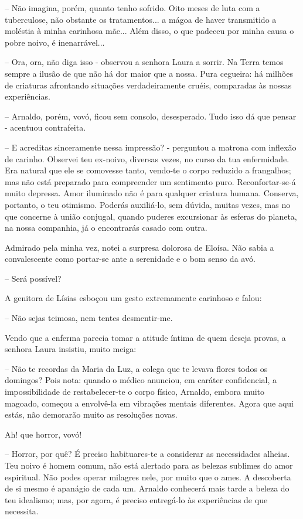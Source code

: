 \documentclass[portuguese,12pt,a4paper]{scrbook}
\begin{document}
	– Não imagina, porém, quanto tenho sofrido. Oito meses de luta com a tuberculose, não obstante os tratamentos... a mágoa de haver transmitido a moléstia à minha carinhosa mãe... Além disso, o que padeceu por minha causa o pobre noivo, é inenarrável...
	
	– Ora, ora, não diga isso - observou a senhora Laura a sorrir. Na Terra temos sempre a ilusão de que não há dor maior que a nossa. Pura cegueira: há milhões de criaturas afrontando situações verdadeiramente cruéis, comparadas às nossas experiências.
	
	– Arnaldo, porém, vovó, ficou sem consolo, desesperado. Tudo isso dá que pensar - acentuou contrafeita.
	
	– E acreditas sinceramente nessa impressão? - perguntou a matrona com inflexão de carinho. Observei teu ex-noivo, diversas vezes, no curso da tua enfermidade. Era natural que ele se comovesse tanto, vendo-te o corpo reduzido a frangalhos; mas não está preparado para compreender um sentimento puro. Reconfortar-se-á muito depressa. Amor iluminado não é para qualquer criatura humana. Conserva, portanto, o teu otimismo. Poderás auxiliá-lo, sem dúvida, muitas vezes, mas no que concerne à união conjugal, quando puderes excursionar às esferas do planeta, na nossa companhia, já o encontrarás casado com outra.
	
	Admirado pela minha vez, notei a surpresa dolorosa de Eloísa. Não sabia a convalescente como portar-se ante a serenidade e o bom senso da avó.
	
	
	– Será possível?
	
	A genitora de Lísias esboçou um gesto extremamente carinhoso e falou:
	
	– Não sejas teimosa, nem tentes desmentir-me.
	
	Vendo que a enferma parecia tomar a atitude íntima de quem deseja provas, a senhora Laura insistiu, muito meiga:
	
	– Não te recordas da Maria da Luz, a colega que te levava flores todos os domingos? Pois nota: quando o médico anunciou, em caráter confidencial, a impossibilidade de restabelecer-te o corpo físico, Arnaldo, embora muito magoado, começou a envolvê-la em vibrações mentais diferentes. Agora que aqui estás, não demorarão muito as resoluções novas.
	
	Ah! que horror, vovó!
	
	– Horror, por quê? É preciso habituares-te a considerar as necessidades alheias. Teu noivo é homem comum, não está alertado para as belezas sublimes do amor espiritual. Não podes operar milagres nele, por muito que o ames. A descoberta de si mesmo é apanágio de cada um. Arnaldo conhecerá mais tarde a beleza do teu idealismo; mas, por agora, é preciso entregá-lo às experiências de que necessita.
	
\end{document}

